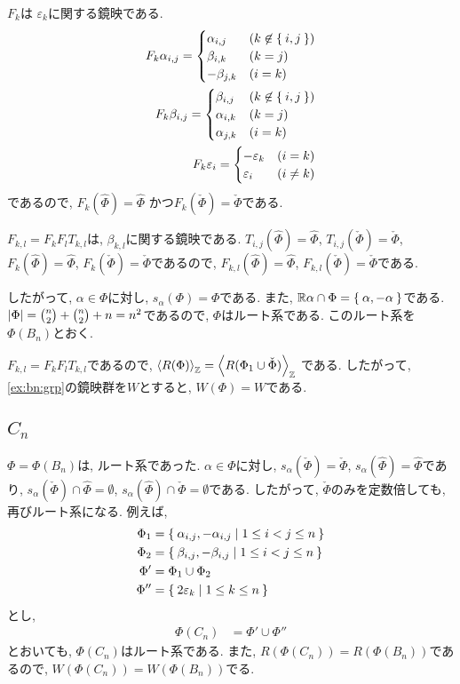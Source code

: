 $F_{k}$は
$\varepsilon_{k}$に関する鏡映である.
\begin{align*}
  F_{k}\alpha_{i,j}=
  \begin{cases}
    \alpha_{i,j} & (k\not\in \Set{i,j})\\
    \beta_{i,k} & (k=j)\\
    -\beta_{j,k} & (i=k)\\
  \end{cases}
  \\
  F_k \beta_{i,j}=
  \begin{cases}
    \beta_{i,j} & (k\not\in \Set{i,j})\\
    \alpha_{i,k} & (k=j)\\
    \alpha_{j,k} & (i=k)
  \end{cases}
  \\
  F_{k}\varepsilon_{i}=
  \begin{cases}
    -\varepsilon_{k}&(i=k)\\
    \varepsilon_{i} &(i\neq k)
  \end{cases}
\end{align*}
であるので, 
$F_{k}(\hat\Phi)=\hat\Phi$
かつ$F_{k}(\check\Phi)=\check\Phi$である.

$F_{k,l}=F_kF_lT_{k,l}$は, $\beta_{k,l}$に関する鏡映である.
$T_{i,j}(\hat\Phi)=\hat\Phi$,
$T_{i,j}(\check\Phi)=\check\Phi$,
$F_{k}(\hat\Phi)=\hat\Phi$,
$F_{k}(\check\Phi)=\check\Phi$であるので,
$F_{k,l}(\hat\Phi)=\hat\Phi$,
$F_{k,l}(\check\Phi)=\check\Phi$である.

したがって, $\alpha\in \Phi$に対し,
$s_{\alpha}(\Phi)=\Phi$である.
また,
$\mathbb{R}\alpha\cap\Phi=\Set{\alpha,-\alpha}$である.
$\left|\Phi\right|=\binom{n}{2}+\binom{n}{2}+n=n^2$であるので,
$\Phi$はルート系である.
このルート系を$\Phi(B_{n})$とおく.

$F_{k,l}=F_kF_lT_{k,l}$であるので,
$\Braket{R(\Phi)}_{\mathbb{Z}}=\Braket{R(\Phi_1\cup \check{\Phi})}_{\mathbb{Z}}$
である.
したがって,
\cref{ex:bn:grp}の鏡映群を$W$とすると,
$W(\Phi)=W$である.

\subsection{$C_{n}$}
\label{ex:cn:root}
$\Phi=\Phi(B_n)$は,
ルート系であった.
$\alpha\in \Phi$に対し,
$s_{\alpha}(\check\Phi)=\check\Phi$,
$s_{\alpha}(\hat\Phi)=\hat\Phi$であり,
$s_{\alpha}(\check\Phi)\cap\hat\Phi=\emptyset$,
$s_{\alpha}(\hat\Phi)\cap\check\Phi=\emptyset$である.
したがって, $\check\Phi$のみを定数倍しても,
再びルート系になる.
例えば,
\begin{align*}
  \Phi_1&=\Set{\alpha_{i,j},-\alpha_{i,j}|1\leq i<j\leq n}\\
  \Phi_2&=\Set{\beta_{i,j},-\beta_{i,j}|1\leq i<j\leq n}\\
  \Phi'&=\Phi_1\cup \Phi_2\\
  \Phi''&=\Set{2\varepsilon_k|1\leq k\leq n}
\end{align*}
とし,
\begin{align*}
  \Phi(C_n)&=\Phi'\cup\Phi''
\end{align*}
とおいても, $\Phi(C_n)$はルート系である.
また,
$R(\Phi(C_n))=R(\Phi(B_n))$であるので,
$W(\Phi(C_n))=W(\Phi(B_n))$でる.


